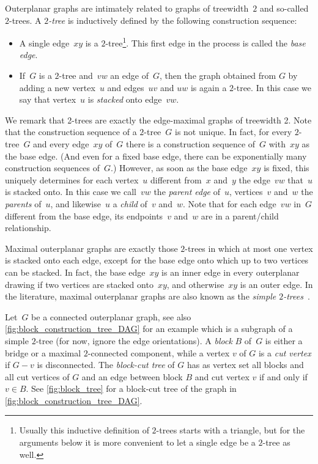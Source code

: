 \documentclass{theoretics}
\begin{document}
Outerplanar graphs are intimately related to graphs of treewidth~$2$ and so-called $2$-trees.
A \emph{$2$-tree} is inductively defined by the following construction sequence:
\begin{itemize}
    \item A single edge~$xy$ is a $2$-tree\footnote{
        Usually this inductive definition of $2$-trees starts with a triangle, but for the arguments below it is more convenient to let a single edge be a $2$-tree as well.
    }.
    This first edge in the process is called the \emph{base edge}.

    \item If~$G$ is a $2$-tree and~$vw$ an edge of~$G$, then the graph obtained from $G$ by adding a new vertex~$u$ and edges~$uv$ and $uw$ is again a $2$-tree.
    In this case we say that vertex~$u$ is \emph{stacked} onto edge~$vw$.
\end{itemize}
We remark that 2-trees are exactly the edge-maximal graphs of treewidth 2.
Note that the construction sequence of a $2$-tree~$G$ is not unique.
In fact, for every $2$-tree~$G$ and every edge~$xy$ of~$G$ there is a construction sequence of~$G$ with~$xy$ as the base edge.
(And even for a fixed base edge, there can be exponentially many construction sequences of~$G$.)
However, as soon as the base edge~$xy$ is fixed, this uniquely determines for each vertex~$u$ different from~$x$ and~$y$ the edge~$vw$ that~$u$ is stacked onto.
In this case we call~$vw$ the \emph{parent edge} of~$u$, vertices~$v$ and~$w$ the \emph{parents} of~$u$, and likewise~$u$ a \emph{child} of~$v$ and~$w$.
Note that for each edge~$vw$ in~$G$ different from the base edge, its endpoints~$v$ and~$w$ are in a parent/child relationship. %

Maximal outerplanar graphs are exactly those $2$-trees in which at most one vertex is stacked onto each edge, except for the base edge onto which up to two vertices can be stacked.
In fact, the base edge~$xy$ is an inner edge in every outerplanar drawing if two vertices are stacked onto~$xy$, and otherwise~$xy$ is an outer edge.
In the literature, maximal outerplanar graphs are also known as the \emph{simple $2$-trees}~\cite{Knauer2012_SimpleTreewidth,Wulf2016_SimpleTreewidth}.

Let~$G$ be a connected outerplanar graph, see also \cref{fig:block_construction_tree_DAG} for an example which is a subgraph of a simple $2$-tree (for now, ignore the edge orientations).
A \emph{block} $B$ of~$G$ is either a bridge or a maximal $2$-connected component, while a vertex $v$ of $G$ is a \emph{cut vertex} if $G-v$ is disconnected.
The \emph{block-cut tree} of $G$ has as vertex set all blocks and all cut vertices of $G$ and an edge between block $B$ and cut vertex $v$ if and only if $v \in B$.
See \cref{fig:block_tree} for a block-cut tree of the graph in \cref{fig:block_construction_tree_DAG}.
\end{document}
